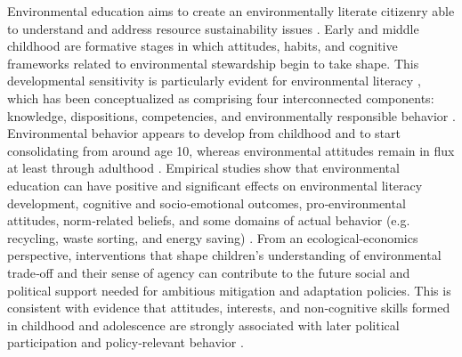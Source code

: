 \documentclass[preprint,12pt]{elsarticle}
\begin{document}
Environmental education aims to create an environmentally literate citizenry able to understand and address resource sustainability issues \cite{ardoin2020early}. Early and middle childhood are formative stages in which attitudes, habits, and cognitive frameworks related to environmental stewardship begin to take shape. This developmental sensitivity is particularly evident for environmental literacy \cite{wilson1996environmental}, which has been conceptualized as comprising four interconnected components: knowledge, dispositions, competencies, and environmentally responsible behavior \citep{hollweg2011framework}. Environmental behavior appears to develop from childhood and to start consolidating from around age 10, whereas environmental attitudes remain in flux at least through adulthood \citep{otto2019development}. Empirical studies show that environmental education can have positive and significant effects on environmental literacy development, cognitive and socio‑emotional outcomes, pro‑environmental attitudes, norm‑related beliefs, and some domains of actual behavior (e.g. recycling, waste sorting, and energy saving) \citep{ardoin2018environmental, ardoin2020early, galeotti2024climate}. From an ecological‑economics perspective, interventions that shape children’s understanding of environmental trade‑off and their sense of agency can contribute to the future social and political support needed for ambitious mitigation and adaptation policies. This is consistent with evidence that attitudes, interests, and non‑cognitive skills formed in childhood and adolescence are strongly associated with later political participation and policy‑relevant behavior \citep{holbein2022promoting, brown2023effect}.
\end{document}
